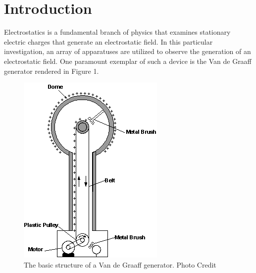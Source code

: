 \documentclass[oneside,12pt]{amsart}
\begin{document}
\section{Introduction}
Electrostatics is a fundamental branch of physics that examines stationary electric charges that generate an electrostatic field. In this particular investigation, an array of apparatuses are utilized to observe the generation of an electrostatic field. One paramount exemplar of such a device is the Van de Graaff generator rendered in Figure 1.\\
\begin{figure}[h]
	\includegraphics[width=\smallgraph,scale=0.01]{Van.png}
	\caption{The basic structure of a Van de Graaff generator. Photo Credit  \cite{Vander}}
	\label{Van}
\end{figure}
\end{document}
